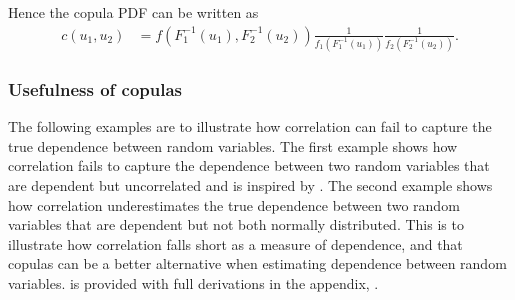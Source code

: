 Hence the copula \gls{PDF} can be written as 
\begin{align*}
    c(u_1,u_2) &= f(F_1^{-1}(u_1),F_2^{-1}(u_2)) \frac{1}{f_1(F_1^{-1}(u_1))}\frac{1}{f_2(F_2^{-1}(u_2))}. 
\end{align*}




\subsubsection{Usefulness of copulas}\label{sec:NeedForCopulas}

The following examples are to illustrate how correlation can fail to capture the true dependence between random variables. The first example shows how correlation fails to capture the dependence between two random variables that are dependent but uncorrelated and is inspired by . The second example shows how correlation underestimates the true dependence between two random variables that are dependent but not both normally distributed. This is to illustrate how correlation falls short as a measure of dependence, and that copulas can be a better alternative when estimating dependence between random variables.  is provided with full derivations in the appendix, .

